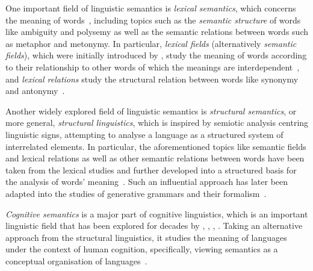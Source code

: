 One important field of linguistic semantics is \emph{lexical semantics}, which concerns the meaning of words~\citep{palmer1981semantics, PUSTEJOVSKY200698, LexicalSemantics}, including topics such as the \emph{semantic structure} of words like ambiguity and polysemy as well as the semantic relations between words such as metaphor and metonymy. In particular, \emph{lexical fields} (alternatively \emph{semantic fields}), which were initially introduced by \citet{trier1931deutsche}, study the meaning of words according to their relationship to other words of which the meanings are interdependent~\citep{palmer1981semantics, jackson2000words}, and \emph{lexical relations} study the structural relation between words like synonymy and antonymy~\citep{LexicalSemantics}.

Another widely explored field of linguistic semantics is \emph{structural semantics}, or more general, \emph{structural linguistics}, which is inspired by  semiotic analysis centring linguistic signs, attempting to analyse a language as a structured system of interrelated elements. In particular, the aforementioned topics like semantic fields and lexical relations as well as other semantic relations between words have been taken from the lexical studies and further developed into a structured basis for the analysis of words' meaning~\citep{LexicalSemantics}. Such an influential approach has later been adapted into the studies of generative grammars and their formalism~\citep{Katz1963-KATTSO-3, Chomsky1975-CHOTLS}.

\emph{Cognitive semantics} is a major part of cognitive linguistics, which is an important linguistic field that has been explored for decades by \citet{Johnson1987-JOHTBI}, \citet{alma9923109163502466}, \citet{alma993245163502466}, \citet{fauconnier1998}. Taking an alternative approach from the structural linguistics, it studies the meaning of languages under the context of human cognition, specifically, viewing semantics as a conceptual organisation of languages~\citep{10.7551/mitpress/6847.001.0001, Croft_Cruse_2004}.

